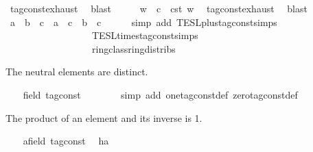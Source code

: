 \begin{isabellebody}
\ tag{\isacharunderscore}const{\isachardot}exhaust\ \isamarkupfalse%
\ blast\isanewline
\ \ \isamarkupfalse%
\ \isamarkupfalse%
\ w\ \ {\isacartoucheopen}c\ {\isacharequal}\ {\isasymtau}\isactrlsub c\isactrlsub s\isactrlsub t\ w{\isacartoucheclose}\ \isamarkupfalse%
\ tag{\isacharunderscore}const{\isachardot}exhaust\ \isamarkupfalse%
\ blast\isanewline
\ \ \isamarkupfalse%
\ \isamarkupfalse%
\ {\isacartoucheopen}{\isacharparenleft}a\ {\isacharplus}\ b{\isacharparenright}\ {\isacharasterisk}\ c\ {\isacharequal}\ a\ {\isacharasterisk}\ c\ {\isacharplus}\ b\ {\isacharasterisk}\ c{\isacartoucheclose}\isanewline
\ \ \ \ \isamarkupfalse%
\ {\isacharparenleft}simp\ add{\isacharcolon}\ TESL{\isachardot}plus{\isacharunderscore}tag{\isacharunderscore}const{\isachardot}simps\isanewline
\ \ \ \ \ \ \ \ \ \ \ \ \ \ \ \ \ \ TESL{\isachardot}times{\isacharunderscore}tag{\isacharunderscore}const{\isachardot}simps\isanewline
\ \ \ \ \ \ \ \ \ \ \ \ \ \ \ \ \ \ ring{\isacharunderscore}class{\isachardot}ring{\isacharunderscore}distribs{\isacharparenleft}{}{\isacharparenright}{\isacharparenright}\isanewline
{}\isamarkupfalse%
%
\begin{isamarkuptext}%
The neutral elements are distinct.%
\end{isamarkuptext}\isamarkuptrue%
\ \ \isamarkupfalse%
\ {\isacartoucheopen}{\isacharparenleft}{}{\isacharcolon}{\isacharcolon}{\isacharparenleft}{\isacharprime}{\isasymtau}{\isacharcolon}{\isacharcolon}field\ tag{\isacharunderscore}const{\isacharparenright}{\isacharparenright}\ {\isasymnoteq}\ {}{\isacartoucheclose}\isanewline
\ \ \ \ \isamarkupfalse%
\ {\isacharparenleft}simp\ add{\isacharcolon}\ one{\isacharunderscore}tag{\isacharunderscore}const{\isacharunderscore}def\ zero{\isacharunderscore}tag{\isacharunderscore}const{\isacharunderscore}def{\isacharparenright}\isanewline
{}\isamarkupfalse%
%
\begin{isamarkuptext}%
The product of an element and its inverse is 1.%
\end{isamarkuptext}\isamarkuptrue%
\ \ \isamarkupfalse%
\ a{\isacharcolon}{\isacharcolon}{\isacartoucheopen}{\isacharprime}{\isasymtau}{\isacharcolon}{\isacharcolon}field\ tag{\isacharunderscore}const{\isacartoucheclose}\ \isamarkupfalse%
\ h{\isacharcolon}{\isacartoucheopen}a\ {\isasymnoteq}\ {}{\isacartoucheclose}\isanewline

\end{isabellebody}
